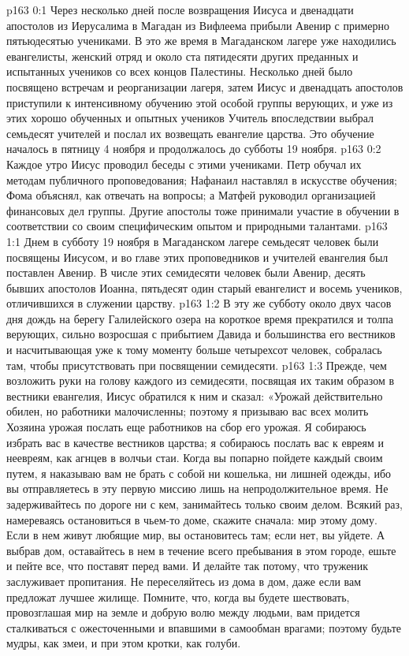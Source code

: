 \author{Комиссия срединников}
\vs p163 0:1 Через несколько дней после возвращения Иисуса и двенадцати апостолов из Иерусалима в Магадан из Вифлеема прибыли Авенир с примерно пятьюдесятью учениками. В это же время в Магаданском лагере уже находились евангелисты, женский отряд и около ста пятидесяти других преданных и испытанных учеников со всех концов Палестины. Несколько дней было посвящено встречам и реорганизации лагеря, затем Иисус и двенадцать апостолов приступили к интенсивному обучению этой особой группы верующих, и уже из этих хорошо обученных и опытных учеников Учитель впоследствии выбрал семьдесят учителей и послал их возвещать евангелие царства. Это обучение началось в пятницу 4 ноября и продолжалось до субботы 19 ноября.
\vs p163 0:2 Каждое утро Иисус проводил беседы с этими учениками. Петр обучал их методам публичного проповедования; Нафанаил наставлял в искусстве обучения; Фома объяснял, как отвечать на вопросы; а Матфей руководил организацией финансовых дел группы. Другие апостолы тоже принимали участие в обучении в соответствии со своим специфическим опытом и природными талантами.
\vs p163 1:1 Днем в субботу 19 ноября в Магаданском лагере семьдесят человек были посвящены Иисусом, и во главе этих проповедников и учителей евангелия был поставлен Авенир. В числе этих семидесяти человек были Авенир, десять бывших апостолов Иоанна, пятьдесят один старый евангелист и восемь учеников, отличившихся в служении царству.
\vs p163 1:2 В эту же субботу около двух часов дня дождь на берегу Галилейского озера на короткое время прекратился и толпа верующих, сильно возросшая с прибытием Давида и большинства его вестников и насчитывающая уже к тому моменту больше четырехсот человек, собралась там, чтобы присутствовать при посвящении семидесяти.
\vs p163 1:3 Прежде, чем возложить руки на голову каждого из семидесяти, посвящая их таким образом в вестники евангелия, Иисус обратился к ним и сказал: «Урожай действительно обилен, но работники малочисленны; поэтому я призываю вас всех молить Хозяина урожая послать еще работников на сбор его урожая. Я собираюсь избрать вас в качестве вестников царства; я собираюсь послать вас к евреям и неевреям, как агнцев в волчьи стаи. Когда вы попарно пойдете каждый своим путем, я наказываю вам не брать с собой ни кошелька, ни лишней одежды, ибо вы отправляетесь в эту первую миссию лишь на непродолжительное время. Не задерживайтесь по дороге ни с кем, занимайтесь только своим делом. Всякий раз, намереваясь остановиться в чьем\hyp{}то доме, скажите сначала: мир этому дому. Если в нем живут любящие мир, вы остановитесь там; если нет, вы уйдете. А выбрав дом, оставайтесь в нем в течение всего пребывания в этом городе, ешьте и пейте все, что поставят перед вами. И делайте так потому, что труженик заслуживает пропитания. Не переселяйтесь из дома в дом, даже если вам предложат лучшее жилище. Помните, что, когда вы будете шествовать, провозглашая мир на земле и добрую волю между людьми, вам придется сталкиваться с ожесточенными и впавшими в самообман врагами; поэтому будьте мудры, как змеи, и при этом кротки, как голуби.
